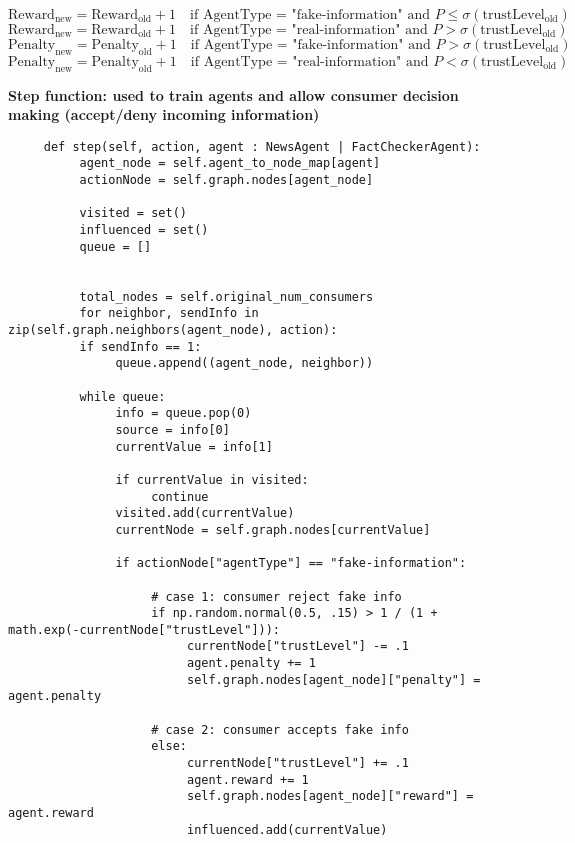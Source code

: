 \documentclass[twoside]{article}
\begin{document}
\[
\text{Reward}_{\text{new}} = \text{Reward}_{\text{old}} + 1 \quad \text{if AgentType = "fake-information" and } P \leq \sigma(\text{trustLevel}_{\text{old}})
\]
\[
\text{Reward}_{\text{new}} = \text{Reward}_{\text{old}} + 1 \quad \text{if AgentType = "real-information" and } P > \sigma(\text{trustLevel}_{\text{old}})
\]
\[
\text{Penalty}_{\text{new}} = \text{Penalty}_{\text{old}} + 1 \quad \text{if  AgentType = "fake-information" and } P > \sigma(\text{trustLevel}_{\text{old}})
\]
\[
\text{Penalty}_{\text{new}} = \text{Penalty}_{\text{old}} + 1 \quad \text{if  AgentType = "real-information" and } P < \sigma(\text{trustLevel}_{\text{old}})
\]

\textbf{Step function: used to train agents and allow consumer decision making (accept/deny incoming information)}
\begin{verbatim}
     def step(self, action, agent : NewsAgent | FactCheckerAgent):
          agent_node = self.agent_to_node_map[agent]
          actionNode = self.graph.nodes[agent_node]

          visited = set()
          influenced = set()
          queue = []
          

          total_nodes = self.original_num_consumers
          for neighbor, sendInfo in zip(self.graph.neighbors(agent_node), action):
          if sendInfo == 1:
               queue.append((agent_node, neighbor))

          while queue:
               info = queue.pop(0)
               source = info[0]
               currentValue = info[1]

               if currentValue in visited:
                    continue
               visited.add(currentValue)
               currentNode = self.graph.nodes[currentValue]
               
               if actionNode["agentType"] == "fake-information":

                    # case 1: consumer reject fake info
                    if np.random.normal(0.5, .15) > 1 / (1 + math.exp(-currentNode["trustLevel"])):
                         currentNode["trustLevel"] -= .1
                         agent.penalty += 1
                         self.graph.nodes[agent_node]["penalty"] = agent.penalty

                    # case 2: consumer accepts fake info
                    else:
                         currentNode["trustLevel"] += .1 
                         agent.reward += 1
                         self.graph.nodes[agent_node]["reward"] = agent.reward
                         influenced.add(currentValue)


\end{verbatim}
\end{document}
